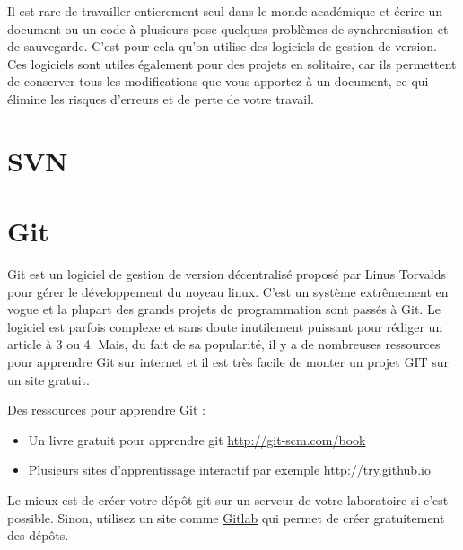 Il est rare de travailler entierement seul dans le monde académique et écrire un document ou un code à plusieurs 
pose quelques problèmes de synchronisation et de sauvegarde. C'est pour cela qu'on utilise des logiciels de gestion de version.
Ces logiciels sont utiles également pour des projets en solitaire, car ils permettent de conserver tous les modifications
que vous apportez à un document, ce qui élimine les risques d'erreurs et de perte de votre travail. 


\section{SVN}


\section{Git}

Git est un logiciel de gestion de version décentralisé proposé par Linus Torvalds pour
gérer le développement du noyeau linux. C'est un système extrêmement en vogue et la plupart des
 grands projets de programmation sont passés à Git. Le logiciel est parfois complexe et sans doute
 inutilement puissant pour rédiger un article à 3 ou 4. Mais, du fait de sa popularité, il y a de nombreuses
 ressources pour apprendre Git sur internet et il est très facile de monter un projet GIT sur un site gratuit.
 
 
 Des ressources pour apprendre Git :
 \begin{itemize}
  \item Un livre gratuit pour apprendre git \url{http://git-scm.com/book}
  \item Plusieurs sites d'apprentissage interactif par exemple  \url{http://try.github.io}
 \end{itemize}

 
 Le mieux est de créer votre dépôt git sur un serveur de votre laboratoire si c'est possible.
 Sinon, utilisez un site comme \href{http://gitlab.org/}{Gitlab} qui permet de créer gratuitement des dépôts.